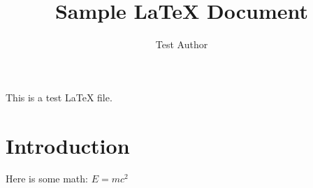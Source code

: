 \documentclass{article}
\begin{document}
\title{Sample LaTeX Document}
\author{Test Author}
\maketitle

This is a test LaTeX file.

\section{Introduction}

Here is some math: $E = mc^2$
\end{document}
